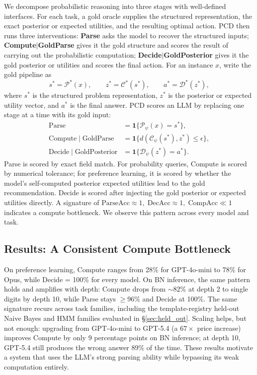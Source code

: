 \documentclass{article}
\begin{document}
We decompose probabilistic reasoning into three stages with well-defined interfaces.
For each task, a gold oracle supplies the structured representation, the exact posterior or expected utilities, and the resulting optimal action.
PCD then runs three interventions: \textbf{Parse} asks the model to recover the structured inputs; \textbf{Compute$\mid$GoldParse} gives it the gold structure and scores the result of carrying out the probabilistic computation; \textbf{Decide$\mid$GoldPosterior} gives it the gold posterior or utilities and scores the final action.
For an instance $x$, write the gold pipeline as
\begin{equation}
s^*=\mathcal{P}^*(x),\qquad z^*=\mathcal{C}^*(s^*),\qquad a^*=\mathcal{D}^*(z^*),
\label{eq:pcd_gold}
\end{equation}
where $s^*$ is the structured problem representation, $z^*$ is the posterior or expected utility vector, and $a^*$ is the final answer.
PCD scores an LLM by replacing one stage at a time with its gold input:
\begin{equation}
\begin{aligned}
\mathrm{Parse} &= \mathbf{1}\{\mathcal{P}_\psi(x)=s^*\},\\
\mathrm{Compute}\mid\mathrm{GoldParse} &= \mathbf{1}\{d(\mathcal{C}_\psi(s^*),z^*)\le \epsilon\},\\
\mathrm{Decide}\mid\mathrm{GoldPosterior} &= \mathbf{1}\{\mathcal{D}_\psi(z^*)=a^*\}.
\end{aligned}
\label{eq:pcd_scores}
\end{equation}
Parse is scored by exact field match.
For probability queries, Compute is scored by numerical tolerance; for preference learning, it is scored by whether the model's self-computed posterior expected utilities lead to the gold recommendation.
Decide is scored after injecting the gold posterior or expected utilities directly.
A signature of $\text{ParseAcc} \approx 1,\; \text{DecAcc} \approx 1,\; \text{CompAcc} \ll 1$ indicates a compute bottleneck.
We observe this pattern across every model and task.

\subsection{Results: A Consistent Compute Bottleneck}

On preference learning, Compute ranges from 28\% for GPT-4o-mini to 78\% for Opus, while Decide = 100\% for every model.
On BN inference, the same pattern holds and amplifies with depth: Compute drops from $\sim$82\% at depth 2 to single digits by depth 10, while Parse stays $\geq$96\% and Decide at 100\%.
The same signature recurs across task families, including the template-registry held-out Naive Bayes and HMM families evaluated in \S\ref{sec:held_out}.
Scaling helps, but not enough: upgrading from GPT-4o-mini to GPT-5.4 (a $67\times$ price increase) improves Compute by only 9 percentage points on BN inference; at depth 10, GPT-5.4 still produces the wrong answer 89\% of the time.
These results motivate a system that uses the LLM's strong parsing ability while bypassing its weak computation entirely.
\end{document}
